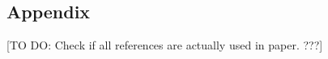 \documentclass[12pt,preprint]{aastex}
\begin{document}











\begin{appendix}
\section{Appendix}

\end{appendix}









%
[TO DO: Check if all references are actually used in paper. ???]
\end{document}
